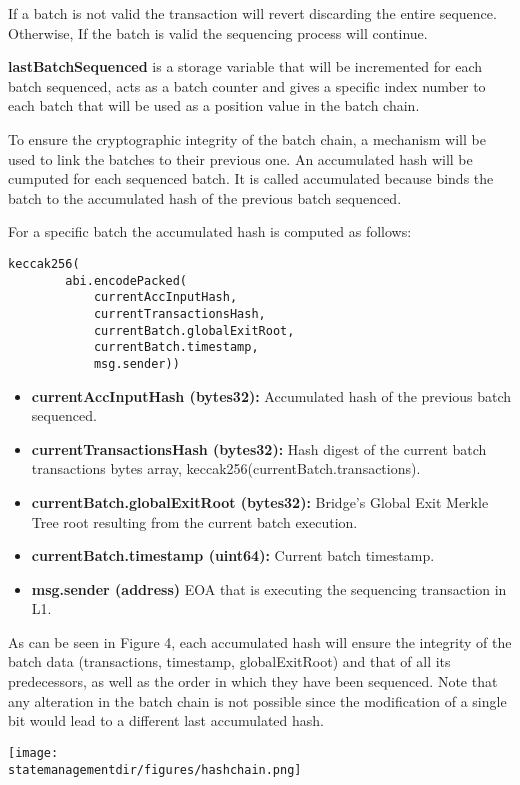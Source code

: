 If a batch is not valid the transaction will revert discarding the entire sequence. Otherwise, If the batch is valid the sequencing process will continue.

\textbf{lastBatchSequenced} is a storage variable that will be incremented for each batch sequenced, acts as a batch counter and gives a specific index number to each batch that will be used as a position value in the batch chain.

To ensure the cryptographic integrity of the batch chain, a mechanism will be used to link the batches to their previous one. An accumulated hash will be cumputed for each sequenced batch. It is called accumulated because binds the batch to the accumulated hash of the previous batch sequenced. 

For a specific batch the accumulated hash is computed as follows:

\begin{lstlisting}[language=Solidity]
	keccak256(
		abi.encodePacked(
			currentAccInputHash,
			currentTransactionsHash,
			currentBatch.globalExitRoot,
			currentBatch.timestamp,
			msg.sender))
\end{lstlisting}

\begin{itemize}
	\item \textbf{currentAccInputHash (bytes32):} Accumulated hash of the previous batch sequenced.
	\item \textbf{currentTransactionsHash (bytes32):} Hash digest of the current batch transactions bytes array, keccak256(currentBatch.transactions).
	\item \textbf{currentBatch.globalExitRoot (bytes32):} Bridge's Global Exit Merkle Tree root resulting from the current batch execution.
	\item \textbf{currentBatch.timestamp (uint64):} Current batch timestamp. 
	\item \textbf{msg.sender (address)} EOA that is executing the sequencing transaction in L1.
\end{itemize}

As can be seen in Figure 4, each accumulated hash will ensure the integrity of the batch data (transactions, timestamp, globalExitRoot) and that of all its predecessors, as well as the order in which they have been sequenced. Note that any alteration in the batch chain is not possible since the modification of a single bit would lead to a different last accumulated hash.

\begin{center}
	\texttt{[image: \\statemanagementdir/figures/hashchain.png]}
\end{center}

